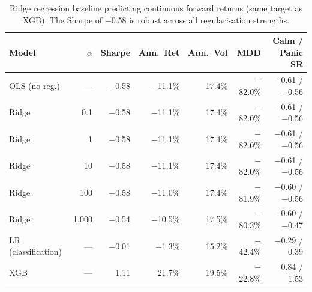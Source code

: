 \begin{table}[H]
\centering
\small
\begin{tabular}{l r r r r r r}
\toprule
Model & $\alpha$ & Sharpe & Ann.\ Ret & Ann.\ Vol & MDD & Calm / Panic SR \\
\midrule
OLS (no reg.) & --- & $-$0.58 & $-$11.1\% & 17.4\% & $-$82.0\% & $-$0.61 / $-$0.56 \\
Ridge & 0.1 & $-$0.58 & $-$11.1\% & 17.4\% & $-$82.0\% & $-$0.61 / $-$0.56 \\
Ridge & 1 & $-$0.58 & $-$11.1\% & 17.4\% & $-$82.0\% & $-$0.61 / $-$0.56 \\
Ridge & 10 & $-$0.58 & $-$11.1\% & 17.4\% & $-$82.0\% & $-$0.61 / $-$0.56 \\
Ridge & 100 & $-$0.58 & $-$11.0\% & 17.4\% & $-$81.9\% & $-$0.60 / $-$0.56 \\
Ridge & 1{,}000 & $-$0.54 & $-$10.5\% & 17.5\% & $-$80.3\% & $-$0.60 / $-$0.47 \\
\midrule
LR (classification) & --- & $-$0.01 & $-$1.3\% & 15.2\% & $-$42.4\% & $-$0.29 / 0.39 \\
XGB & --- & 1.11 & 21.7\% & 19.5\% & $-$22.8\% & 0.84 / 1.53 \\
\bottomrule
\end{tabular}
\caption{Ridge regression baseline predicting continuous forward returns (same target as XGB). The Sharpe of $-$0.58 is robust across all regularisation strengths.}
\label{tab:ridge}
\end{table}
